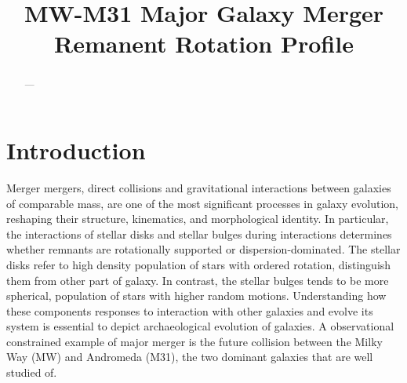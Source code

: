 \documentclass[twocolumn, trackchanges]{aastex7}
\begin{document}
\title{MW-M31 Major Galaxy Merger Remanent Rotation Profile}


\begin{abstract}
    ---
\end{abstract}


\section{Introduction} 




Merger mergers, direct collisions and gravitational interactions between galaxies of comparable mass, are one of the most significant processes in galaxy evolution, reshaping their structure, kinematics, and morphological identity. In particular, the interactions of stellar disks and stellar bulges during interactions determines whether remnants are rotationally supported or dispersion-dominated. The stellar disks refer to high density population of stars with ordered rotation, distinguish them from other part of galaxy. In contrast, the stellar bulges tends to be more spherical, population of stars with higher random motions. Understanding how these components responses to interaction with other galaxies and evolve its system is essential to depict archaeological evolution of galaxies. A observational constrained example of major merger is the future collision between the Milky Way (MW) and Andromeda (M31), the two dominant galaxies that are well studied of. 
\end{document}
